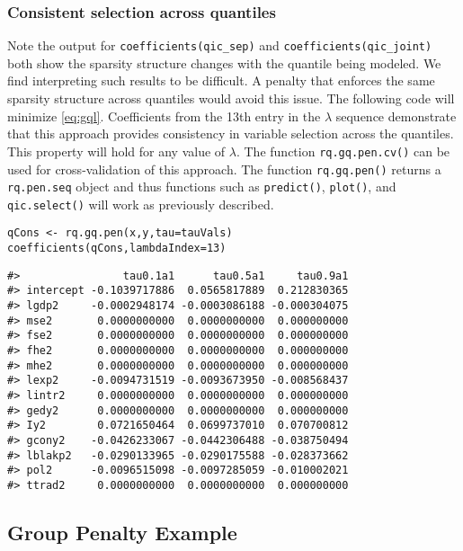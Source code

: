 \subsubsection{Consistent selection across quantiles}\label{consistent-selection-across-quantiles-1}

Note the output for \texttt{coefficients(qic\_sep)} and \texttt{coefficients(qic\_joint)} both show the sparsity structure changes with the quantile being modeled. We find interpreting such results to be difficult. A penalty that enforces the same sparsity structure across quantiles would avoid this issue. The following code will minimize \eqref{eq:gql}. Coefficients from the 13th entry in the \(\lambda\) sequence demonstrate that this approach provides consistency in variable selection across the quantiles. This property will hold for any value of \(\lambda\). The function \texttt{rq.gq.pen.cv()} can be used for cross-validation of this approach. The function \texttt{rq.gq.pen()} returns a \texttt{rq.pen.seq} object and thus functions such as \texttt{predict()}, \texttt{plot()}, and \texttt{qic.select()} will work as previously described.

\begin{verbatim}
qCons <- rq.gq.pen(x,y,tau=tauVals)
coefficients(qCons,lambdaIndex=13)
\end{verbatim}

\begin{verbatim}
#>                tau0.1a1      tau0.5a1     tau0.9a1
#> intercept -0.1039717886  0.0565817889  0.212830365
#> lgdp2     -0.0002948174 -0.0003086188 -0.000304075
#> mse2       0.0000000000  0.0000000000  0.000000000
#> fse2       0.0000000000  0.0000000000  0.000000000
#> fhe2       0.0000000000  0.0000000000  0.000000000
#> mhe2       0.0000000000  0.0000000000  0.000000000
#> lexp2     -0.0094731519 -0.0093673950 -0.008568437
#> lintr2     0.0000000000  0.0000000000  0.000000000
#> gedy2      0.0000000000  0.0000000000  0.000000000
#> Iy2        0.0721650464  0.0699737010  0.070700812
#> gcony2    -0.0426233067 -0.0442306488 -0.038750494
#> lblakp2   -0.0290133965 -0.0290175588 -0.028373662
#> pol2      -0.0096515098 -0.0097285059 -0.010002021
#> ttrad2     0.0000000000  0.0000000000  0.000000000
\end{verbatim}

\subsection{Group Penalty Example}\label{group-penalty-example}

